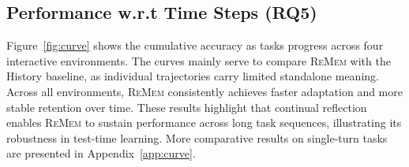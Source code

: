 \subsection{Performance w.r.t Time Steps (RQ5)}

Figure~\ref{fig:curve} shows the cumulative accuracy as tasks progress across four interactive environments.
The curves mainly serve to compare \textsc{ReMem} with the History baseline, as individual trajectories carry limited standalone meaning.
Across all environments, \textsc{ReMem} consistently achieves faster adaptation and more stable retention over time.
These results highlight that continual reflection enables \textsc{ReMem} to sustain performance across long task sequences, illustrating its robustness in test-time learning. More comparative results on single-turn tasks are presented in Appendix~\ref{app:curve}.

















